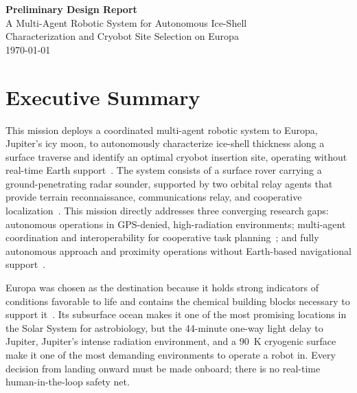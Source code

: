 \documentclass[11pt]{article}
\begin{document}
\begin{center}
    {\LARGE\bfseries Preliminary Design Report}\\[4pt]
    {\Large A Multi-Agent Robotic System for Autonomous Ice-Shell}\\
    {\Large Characterization and Cryobot Site Selection on Europa}\\[10pt]
    {\large \today}
\end{center}

\newpage
\tableofcontents
\newpage

\section{Executive Summary}

This mission deploys a coordinated multi-agent robotic system to Europa, Jupiter's icy moon, to
autonomously characterize ice-shell thickness along a surface traverse and identify an optimal
cryobot insertion site, operating without real-time Earth support~\cite{owlDecadal}. The system
consists of a surface rover carrying a ground-penetrating radar sounder, supported by two
orbital relay agents that provide terrain reconnaissance, communications relay, and cooperative
localization~\cite{nasaSBIR}. This mission directly addresses three converging research gaps:
autonomous operations in GPS-denied, high-radiation environments; multi-agent coordination and
interoperability for cooperative task planning~\cite{stmdShortfall}; and fully autonomous
approach and proximity operations without Earth-based navigational support~\cite{nasaSBIR}.

Europa was chosen as the destination because it holds strong indicators of conditions favorable
to life and contains the chemical building blocks necessary to support it~\cite{owlDecadal}. Its
subsurface ocean makes it one of the most promising locations in the Solar System for
astrobiology, but the 44-minute one-way light delay to Jupiter, Jupiter's intense radiation
environment, and a $90$~K cryogenic surface make it one of the most demanding environments to
operate a robot in. Every decision from landing onward must be made onboard; there is no
real-time human-in-the-loop safety net.
\end{document}
